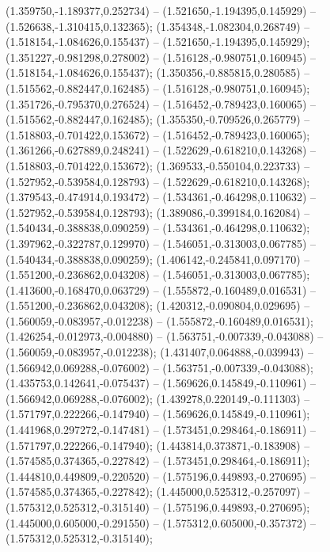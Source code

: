 (1.359750,-1.189377,0.252734) -- (1.521650,-1.194395,0.145929) -- (1.526638,-1.310415,0.132365);
 (1.354348,-1.082304,0.268749) -- (1.518154,-1.084626,0.155437) -- (1.521650,-1.194395,0.145929);
 (1.351227,-0.981298,0.278002) -- (1.516128,-0.980751,0.160945) -- (1.518154,-1.084626,0.155437);
 (1.350356,-0.885815,0.280585) -- (1.515562,-0.882447,0.162485) -- (1.516128,-0.980751,0.160945);
 (1.351726,-0.795370,0.276524) -- (1.516452,-0.789423,0.160065) -- (1.515562,-0.882447,0.162485);
 (1.355350,-0.709526,0.265779) -- (1.518803,-0.701422,0.153672) -- (1.516452,-0.789423,0.160065);
 (1.361266,-0.627889,0.248241) -- (1.522629,-0.618210,0.143268) -- (1.518803,-0.701422,0.153672);
 (1.369533,-0.550104,0.223733) -- (1.527952,-0.539584,0.128793) -- (1.522629,-0.618210,0.143268);
 (1.379543,-0.474914,0.193472) -- (1.534361,-0.464298,0.110632) -- (1.527952,-0.539584,0.128793);
 (1.389086,-0.399184,0.162084) -- (1.540434,-0.388838,0.090259) -- (1.534361,-0.464298,0.110632);
 (1.397962,-0.322787,0.129970) -- (1.546051,-0.313003,0.067785) -- (1.540434,-0.388838,0.090259);
 (1.406142,-0.245841,0.097170) -- (1.551200,-0.236862,0.043208) -- (1.546051,-0.313003,0.067785);
 (1.413600,-0.168470,0.063729) -- (1.555872,-0.160489,0.016531) -- (1.551200,-0.236862,0.043208);
 (1.420312,-0.090804,0.029695) -- (1.560059,-0.083957,-0.012238) -- (1.555872,-0.160489,0.016531);
 (1.426254,-0.012973,-0.004880) -- (1.563751,-0.007339,-0.043088) -- (1.560059,-0.083957,-0.012238);
 (1.431407,0.064888,-0.039943) -- (1.566942,0.069288,-0.076002) -- (1.563751,-0.007339,-0.043088);
 (1.435753,0.142641,-0.075437) -- (1.569626,0.145849,-0.110961) -- (1.566942,0.069288,-0.076002);
 (1.439278,0.220149,-0.111303) -- (1.571797,0.222266,-0.147940) -- (1.569626,0.145849,-0.110961);
 (1.441968,0.297272,-0.147481) -- (1.573451,0.298464,-0.186911) -- (1.571797,0.222266,-0.147940);
 (1.443814,0.373871,-0.183908) -- (1.574585,0.374365,-0.227842) -- (1.573451,0.298464,-0.186911);
 (1.444810,0.449809,-0.220520) -- (1.575196,0.449893,-0.270695) -- (1.574585,0.374365,-0.227842);
 (1.445000,0.525312,-0.257097) -- (1.575312,0.525312,-0.315140) -- (1.575196,0.449893,-0.270695);
 (1.445000,0.605000,-0.291550) -- (1.575312,0.605000,-0.357372) -- (1.575312,0.525312,-0.315140);
